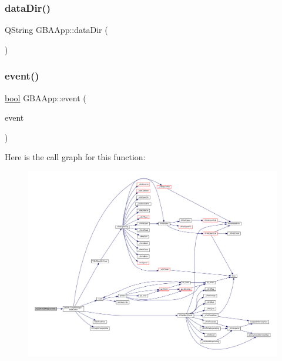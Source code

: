 \subsubsection{\texorpdfstring{data\+Dir()}{dataDir()}}
{\footnotesize\ttfamily Q\+String G\+B\+A\+App\+::data\+Dir (\begin{DoxyParamCaption}{ }\end{DoxyParamCaption})\hspace{0.3cm}{\ttfamily [static]}}

\mbox{\label{class_q_g_b_a_1_1_g_b_a_app_a0c830b8ac4070d9c1ccd5be1055e693f}} 
\subsubsection{\texorpdfstring{event()}{event()}}
{\footnotesize\ttfamily \mbox{\hyperlink{libretro_8h_a4a26dcae73fb7e1528214a068aca317e}{bool}} G\+B\+A\+App\+::event (\begin{DoxyParamCaption}\item[{Q\+Event $\ast$}]{event }\end{DoxyParamCaption})\hspace{0.3cm}{\ttfamily [protected]}}

Here is the call graph for this function\+:
\nopagebreak
\begin{figure}[H]
\begin{center}
\leavevmode
\includegraphics[width=350pt]{class_q_g_b_a_1_1_g_b_a_app_a0c830b8ac4070d9c1ccd5be1055e693f_cgraph}
\end{center}
\end{figure}
\mbox{\label{class_q_g_b_a_1_1_g_b_a_app_a72d44afdcf810bcf2859e725ec3a2a54}} 
